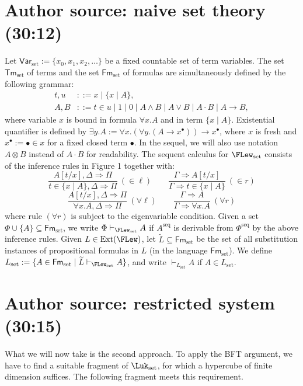 \section*{Author source: naive set theory (30:12)}
Let $\mathsf{Var}_{\mathrm{set}}:=\{x_0,x_1,x_2,\ldots\}$ be a fixed countable set of term variables. The set $\mathsf{Tm}_{\mathrm{set}}$ of terms and the set $\mathsf{Fm}_{\mathrm{set}}$ of formulas are simultaneously defined by the following grammar:
\[
 \begin{aligned}
 t,u&::=x\mid\{x\mid A\},\\
 A,B&::=t\in u\mid1\mid0\mid A\wedge B\mid A\vee B\mid A\cdot B\mid A\to B,
 \end{aligned}
\]
where variable $x$ is bound in formula $\forall x.A$ and in term $\{x\mid A\}$. Existential quantifier is defined by $\exists y.A:=\forall x.(\forall y.(A\to x^{\bullet}))\to x^{\bullet}$, where $x$ is fresh and $x^{\bullet}:=\bullet\in x$ for a fixed closed term $\bullet$. In the sequel, we will also use notation $A\otimes B$ instead of $A\cdot B$ for readability.
The sequent calculus for $\FLew_{\mathrm{set}}$ consists of the inference rules in Figure 1 together with:
\[
 \frac{A[t/x],\Delta\Rightarrow\Pi}{t\in\{x\mid A\},\Delta\Rightarrow\Pi}\ (\in\ell)\qquad
 \frac{\Gamma\Rightarrow A[t/x]}{\Gamma\Rightarrow t\in\{x\mid A\}}\ (\in r)
\]
\[
 \frac{A[t/x],\Delta\Rightarrow\Pi}{\forall x.A,\Delta\Rightarrow\Pi}\ (\forall\ell)\qquad
 \frac{\Gamma\Rightarrow A}{\Gamma\Rightarrow\forall x.A}\ (\forall r)
\]
where rule $(\forall r)$ is subject to the eigenvariable condition.
Given a set $\Phi\cup\{A\}\subseteq\mathsf{Fm}_{\mathrm{set}}$, we write $\Phi\vdash_{\FLew_{\mathrm{set}}}A$ if $A^{\mathrm{seq}}$ is derivable from $\Phi^{\mathrm{seq}}$ by the above inference rules.
Given $L\in\operatorname{Ext}(\FLew)$, let $\widetilde L\subseteq\mathsf{Fm}_{\mathrm{set}}$ be the set of all substitution instances of propositional formulas in $L$ (in the language $\mathsf{Fm}_{\mathrm{set}}$). We define $L_{\mathrm{set}}:=\{A\in\mathsf{Fm}_{\mathrm{set}}\mid\widetilde L\vdash_{\FLew_{\mathrm{set}}}A\}$, and write $\vdash_{L_{\mathrm{set}}}A$ if $A\in L_{\mathrm{set}}$.
\section*{Author source: restricted system (30:15)}
What we will now take is the second approach. To apply the BFT argument, we have to find a suitable fragment of $\Luk_{\mathrm{set}}$, for which a hypercube of finite dimension suffices. The following fragment meets this requirement.
